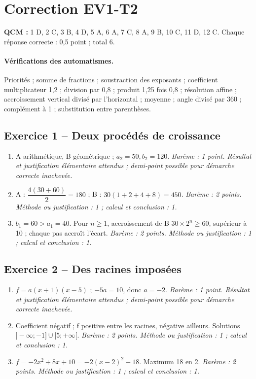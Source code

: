 \clearpage\section*{Correction EV1-T2}\label{EV1-T2-CORR}
\textbf{QCM :} 1 D, 2 C, 3 B, 4 D, 5 A, 6 A, 7 C, 8 A, 9 B, 10 C, 11 D, 12 C. Chaque réponse correcte : 0,5 point ; total 6.
\paragraph{Vérifications des automatismes.} Priorités ; somme de fractions ; soustraction des exposants ; coefficient multiplicateur 1,2 ; division par 0,8 ; produit 1,25 fois 0,8 ; résolution affine ; accroissement vertical divisé par l’horizontal ; moyenne ; angle divisé par 360 ; complément à 1 ; substitution entre parenthèses.
\subsection*{Exercice 1 -- Deux procédés de croissance}
\begin{enumerate}
\item A arithmétique, B géométrique ; $a_2=50,b_2=120$. \textit{Barème : 1 point. Résultat et justification élémentaire attendus ; demi-point possible pour démarche correcte inachevée.}
\item A : $\dfrac{4(30+60)}{2}=180$ ; B : $30(1+2+4+8)=450$. \textit{Barème : 2 points. Méthode ou justification : 1 ; calcul et conclusion : 1.}
\item $b_1=60>a_1=40$. Pour $n\geq1$, accroissement de B $30\times2^n\geq60$, supérieur à 10 ; chaque pas accroît l’écart. \textit{Barème : 2 points. Méthode ou justification : 1 ; calcul et conclusion : 1.}
\end{enumerate}
\subsection*{Exercice 2 -- Des racines imposées}
\begin{enumerate}
\item $f=a(x+1)(x-5)$ ; $-5a=10$, donc $a=-2$. \textit{Barème : 1 point. Résultat et justification élémentaire attendus ; demi-point possible pour démarche correcte inachevée.}
\item Coefficient négatif ; f positive entre les racines, négative ailleurs. Solutions $]-\infty;-1]\cup[5;+\infty[$. \textit{Barème : 2 points. Méthode ou justification : 1 ; calcul et conclusion : 1.}
\item $f=-2x^2+8x+10=-2(x-2)^2+18$. Maximum 18 en 2. \textit{Barème : 2 points. Méthode ou justification : 1 ; calcul et conclusion : 1.}
\end{enumerate}
